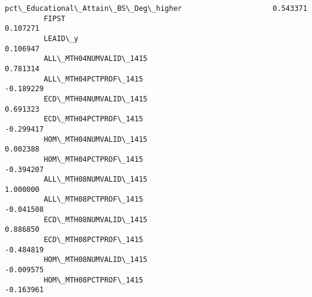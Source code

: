 \documentclass[11pt]{article}
\begin{document}
\begin{Verbatim}[commandchars=\\\{\}]
         pct\_Educational\_Attain\_BS\_Deg\_higher                     0.543371   
         FIPST                                                    0.107271   
         LEAID\_y                                                  0.106947   
         ALL\_MTH04NUMVALID\_1415                                   0.781314   
         ALL\_MTH04PCTPROF\_1415                                   -0.189229   
         ECD\_MTH04NUMVALID\_1415                                   0.691323   
         ECD\_MTH04PCTPROF\_1415                                   -0.299417   
         HOM\_MTH04NUMVALID\_1415                                   0.002388   
         HOM\_MTH04PCTPROF\_1415                                   -0.394207   
         ALL\_MTH08NUMVALID\_1415                                   1.000000   
         ALL\_MTH08PCTPROF\_1415                                   -0.041508   
         ECD\_MTH08NUMVALID\_1415                                   0.886850   
         ECD\_MTH08PCTPROF\_1415                                   -0.484819   
         HOM\_MTH08NUMVALID\_1415                                  -0.009575   
         HOM\_MTH08PCTPROF\_1415                                   -0.163961   
         

\end{Verbatim}
\end{document}
